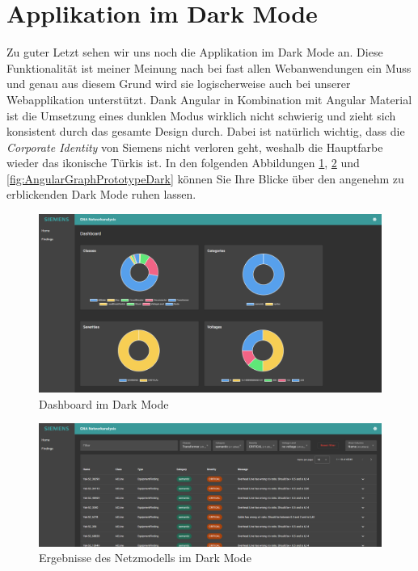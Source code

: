 \section{Applikation im Dark Mode}

Zu guter Letzt sehen wir uns noch die Applikation im Dark Mode an. Diese Funktionalität ist meiner Meinung nach bei fast allen Webanwendungen ein Muss und genau aus diesem Grund wird sie logischerweise auch bei unserer Webapplikation unterstützt. Dank Angular in Kombination mit Angular Material ist die Umsetzung eines dunklen Modus wirklich nicht schwierig und zieht sich konsistent durch das gesamte Design durch. Dabei ist natürlich wichtig, dass die \emph{Corporate Identity} von Siemens nicht verloren geht, weshalb die Hauptfarbe wieder das ikonische Türkis ist. In den folgenden Abbildungen \ref{fig:AngularDashboardPrototypeDark}, \ref{fig:AngularFindingsPrototypeDark} und \ref{fig:AngularGraphPrototypeDark} können Sie Ihre Blicke über den angenehm zu erblickenden Dark Mode ruhen lassen.

\begin{figure}
    \centering
    \includegraphics[width=1\textwidth]{content/img/Empire/Frontend/Angular_Dashboard_Prototype_Dark.png}
    \caption{Dashboard im Dark Mode}
    \label{fig:AngularDashboardPrototypeDark}
\end{figure}
\FloatBarrier

\begin{figure}
    \centering
    \includegraphics[width=1\textwidth]{content/img/Empire/Frontend/Angular_Findings_Prototype_Dark.png}
    \caption{Ergebnisse des Netzmodells im Dark Mode}
    \label{fig:AngularFindingsPrototypeDark}
\end{figure}
\FloatBarrier

